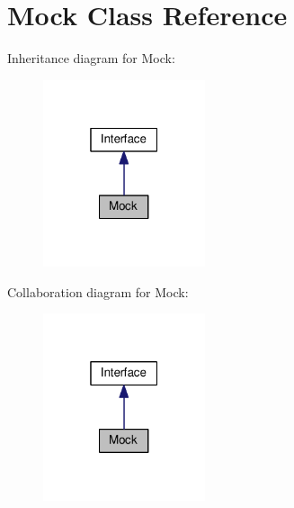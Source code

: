 \hypertarget{classMock}{}\section{Mock Class Reference}
\label{classMock}


Inheritance diagram for Mock\+:\nopagebreak
\begin{figure}[H]
\begin{center}
\leavevmode
\includegraphics[width=135pt]{classMock__inherit__graph}
\end{center}
\end{figure}


Collaboration diagram for Mock\+:\nopagebreak
\begin{figure}[H]
\begin{center}
\leavevmode
\includegraphics[width=135pt]{classMock__coll__graph}
\end{center}
\end{figure}
